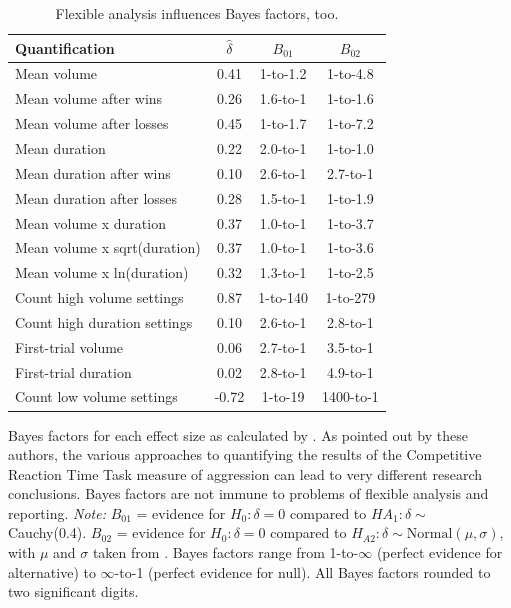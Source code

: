 \documentclass[man]{apa6}
\begin{document}
\begin{table}
\caption{Flexible analysis influences Bayes factors, too.}
\begin{center}
\begin{tabular}{lccc}
Quantification&$\hat{\delta}$&$B_{01}$&$B_{02}$ \\ \hline
Mean volume&0.41&1-to-1.2&1-to-4.8 \\
Mean volume after wins&0.26&1.6-to-1&1-to-1.6 \\
Mean volume after losses &0.45&1-to-1.7&1-to-7.2 \\
Mean duration &0.22&2.0-to-1&1-to-1.0 \\
Mean duration after wins&0.10&2.6-to-1&2.7-to-1 \\
Mean duration after losses &0.28&1.5-to-1&1-to-1.9 \\
Mean volume x duration &0.37&1.0-to-1&1-to-3.7 \\
Mean volume x sqrt(duration)&0.37&1.0-to-1&1-to-3.6 \\
Mean volume x ln(duration) &0.32&1.3-to-1&1-to-2.5 \\ 
Count high volume settings &0.87&1-to-140&1-to-279 \\
Count high duration settings &0.10&2.6-to-1&2.8-to-1 \\
First-trial volume &0.06&2.7-to-1&3.5-to-1 \\ 
First-trial duration&0.02&2.8-to-1&4.9-to-1 \\
Count low volume settings&-0.72&1-to-19&1400-to-1 \\
\end{tabular}
\end{center}

\vspace{4mm}
Bayes factors for each effect size as calculated by \citet[study 2, table 2]{Elson:etal:2014}. As pointed out by these authors, the various approaches to quantifying the results of the Competitive Reaction Time Task measure of aggression can lead to very different research conclusions. Bayes factors are not immune to problems of flexible analysis and reporting. {\em Note:} $B_{01}$ = evidence for $H_0: \delta = 0$ compared to $HA_1: \delta \sim$ Cauchy(0.4). $B_{02}$ = evidence for $H_0: \delta = 0$ compared to $H_{A2}: \delta \sim \mbox{Normal}(\mu, \sigma)$, with $\mu$ and $\sigma$ taken from \citet{Anderson:etal:2010}. Bayes factors range from 1-to-$\infty$ (perfect evidence for alternative) to $\infty$-to-1 (perfect evidence for null). All Bayes factors rounded to two significant digits.
\label{ElsonCRTTHacking}
\end{table}

\newpage


\end{document}
